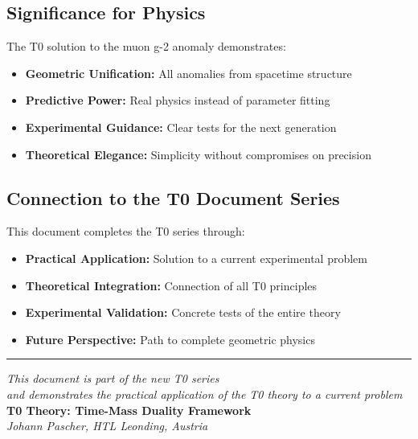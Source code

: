 \documentclass[12pt,a4paper]{article}
\begin{document}
	\subsection{Significance for Physics}
	
	The T0 solution to the muon g-2 anomaly demonstrates:
	
	\begin{itemize}
		\item \textbf{Geometric Unification:} All anomalies from spacetime structure
		\item \textbf{Predictive Power:} Real physics instead of parameter fitting
		\item \textbf{Experimental Guidance:} Clear tests for the next generation
		\item \textbf{Theoretical Elegance:} Simplicity without compromises on precision
	\end{itemize}
	
	\subsection{Connection to the T0 Document Series}
	
	This document completes the T0 series through:
	
	\begin{itemize}
		\item \textbf{Practical Application:} Solution to a current experimental problem
		\item \textbf{Theoretical Integration:} Connection of all T0 principles
		\item \textbf{Experimental Validation:} Concrete tests of the entire theory
		\item \textbf{Future Perspective:} Path to complete geometric physics
	\end{itemize}
	
	\begin{center}
		\hrule
		\vspace{0.5cm}
		\textit{This document is part of the new T0 series}\\
		\textit{and demonstrates the practical application of the T0 theory to a current problem}\\
		\vspace{0.3cm}
		\textbf{T0 Theory: Time-Mass Duality Framework}\\
		\textit{Johann Pascher, HTL Leonding, Austria}\\
	\end{center}
	
\end{document}
